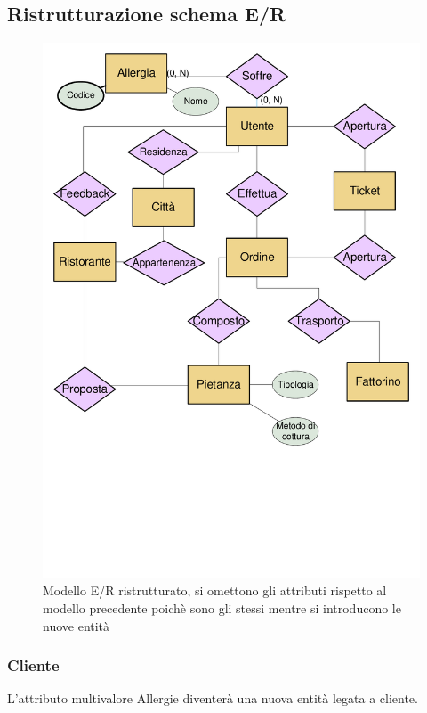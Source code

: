 \documentclass[10pt]{article}
\begin{document}
		\subsection{Ristrutturazione schema E/R}
			\begin{figure}[H]
			\begin{center}
				\hspace*{-1cm}
				\includegraphics[scale=0.54]{er_ristrutturato.pdf}
				\hspace*{-1cm}
            \caption{Modello E/R ristrutturato, si omettono gli attributi rispetto al modello precedente poich\`e sono gli stessi mentre si introducono le nuove entit\`a }
            \label{fig:ER2}
        	\end{center}
		\end{figure}
			\subsubsection{Cliente} 
			L'attributo multivalore Allergie\footnotemark{} diventer\`a una nuova entit\`a legata a cliente.
\end{document}
